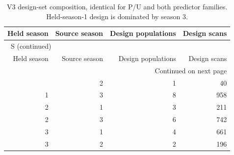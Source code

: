 \documentclass[10pt,a4paper]{article}
\renewcommand{\thetable}{S\arabic{table}}
\begin{document}
\clearpage
\begingroup\small
\setlength{\tabcolsep}{3.5pt}
\renewcommand{\arraystretch}{1.10}
\begin{longtable}{rrrr}
\caption{V3 design-set composition, identical for P/U and both predictor families. Held-season-1 design is dominated by season 3.}\label{tab:designcomposition}\\
\toprule
Held season & Source season & Design populations & Design scans \\
\midrule
\endfirsthead
\multicolumn{4}{l}{\tablename~\thetable{} (continued)}\\
\toprule
Held season & Source season & Design populations & Design scans \\
\midrule
\endhead
\midrule
\multicolumn{4}{r}{Continued on next page}\\
\endfoot
\bottomrule
\endlastfoot
1 & 2 & 1 & 40 \\
1 & 3 & 8 & 958 \\
2 & 1 & 3 & 211 \\
2 & 3 & 6 & 742 \\
3 & 1 & 4 & 661 \\
3 & 2 & 2 & 196 \\
\end{longtable}
\endgroup
\end{document}
